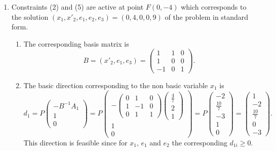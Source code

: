 \begin{enumerate}
\item   Constraints (2) and (5) are active at point $F(0,-4)$ which corresponds to the solution  $(x_1,x'_2,e_1,e_2,e_3 )=(0,4,0,0,9)$ of the problem in standard form.
 
\begin{enumerate}
\item The corresponding basis matrix is 
\[
B = (x'_2,e_1, e_3)=
\begin{pmatrix}
1  & 1 & 0  \\
1  & 0 & 0  \\
-1  & 0 & 1  
\end{pmatrix}.
\]
\item The basic direction corresponding to the non basic variable $x_1$ is 
$$d_1 = P \begin{pmatrix} 
-B^{-1} A_1\\ 
1\\
0
 \end{pmatrix} 
= P \begin{pmatrix} 
-\begin{pmatrix} 
0 & 1  &0\\
1  & -1 & 0 \\
0 & 1 & 1 
\end{pmatrix} 
 \begin{pmatrix}
\frac{4}{7} \\
2 \\
1
\end{pmatrix} \\ 
1 \\
0 
\end{pmatrix} 
= P \begin{pmatrix}
 -2\\
\frac{10}{7} \\
- 3 \\ 
 1\\
 0
 \end{pmatrix} = 
  \begin{pmatrix}
 1\\
-2\\
 \frac{10}{7} \\ 
 0\\
 -3
 \end{pmatrix}.
 $$
 This direction is  feasible since for $x_1$, $e_1$ and $e_2$  the corresponding $d_{1i} \geq0 $.


\end{enumerate}
\end{enumerate}
